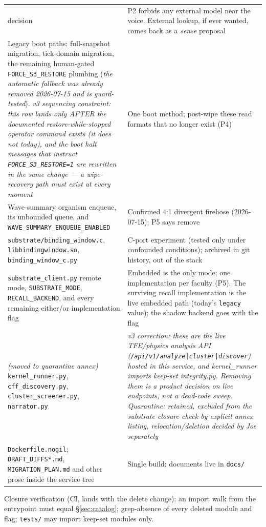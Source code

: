 \documentclass[11pt]{article}
\begin{document}
\begin{longtable}{p{} p{}}
{decision} &
P2 forbids any external model near the voice. External lookup, if ever
wanted, comes back as a \emph{sense} proposal \\
Legacy boot paths: full-snapshot migration, tick-domain migration, the
remaining human-gated \texttt{FORCE\_S3\_RESTORE} plumbing (\emph{the
automatic fallback was already removed 2026-07-15 and is guard-tested}).
\emph{v3 sequencing constraint: this row lands only AFTER the documented
restore-while-stopped operator command exists (it does not today), and
the boot halt messages that instruct \texttt{FORCE\_S3\_RESTORE=1} are
rewritten in the same change — a wipe-recovery path must exist at every
moment} &
One boot method; post-wipe these read formats that no longer exist (P4) \\
Wave-summary organism enqueue, its unbounded queue, and
\texttt{WAVE\_SUMMARY\_ENQUEUE\_ENABLED} &
Confirmed 4:1 divergent firehose (2026-07-15); P5 says remove \\
\texttt{substrate/binding\_window.c}, \texttt{libbindingwindow.so},
\texttt{binding\_window\_c.py} &
C-port experiment (tested only under confounded conditions); archived in
git history, out of the stack \\
\texttt{substrate\_client.py} remote mode, \texttt{SUBSTRATE\_MODE},
\texttt{RECALL\_BACKEND}, and every remaining either/or implementation
flag &
Embedded is the only mode; one implementation per faculty (P5). The
surviving recall implementation is the live embedded path (today's
\texttt{legacy} value); the shadow backend goes with the flag \\
\emph{(moved to quarantine annex)} \texttt{kernel\_runner.py},
\texttt{cff\_discovery.py}, \texttt{cluster\_screener.py},
\texttt{narrator.py} &
\emph{v3 correction: these are the live TFE/physics analysis API
(\texttt{/api/v1/analyze|cluster|discover}) hosted in this service, and
kernel\_runner imports keep-set integrity.py. Removing them is a product
decision on live endpoints, not a dead-code sweep. Quarantine: retained,
excluded from the substrate closure check by explicit annex listing,
relocation/deletion decided by Joe separately} \\
\texttt{Dockerfile.nogil}; \texttt{DRAFT\_DIFFS*.md},
\texttt{MIGRATION\_PLAN.md} and other prose inside the service tree &
Single build; documents live in \texttt{docs/} \\
\bottomrule
\end{longtable}

Closure verification (CI, lands with the delete change): an import walk
from the entrypoint must equal \S\ref{sec:catalog}; grep-absence of every
deleted module and flag; \texttt{tests/} may import keep-set modules only.
\end{document}
